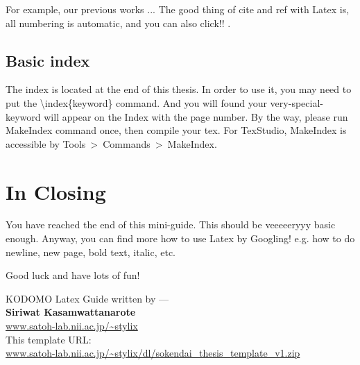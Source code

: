 For example, our previous works \cite{BibKeyLabel1,BibKeyLabel2}... The good thing of cite and ref with Latex is, all numbering is automatic, and you can also click!! \cite{BibKeyLabel3}.

\clearpage %


\subsection{Basic index}
\label{basic_index}
The index is located at the end of this thesis.
In order to use it,
you may need to put the \textbackslash index\{keyword\} command.
And you will found your very-special-keyword  will appear on the Index with the page number.
By the way, please run MakeIndex command once, then compile your tex.
\eg For TexStudio, MakeIndex is accessible by Tools~\textgreater~Commands~\textgreater~MakeIndex.

\clearpage %


\section{In Closing}
\label{closing}
You have reached the end of this mini-guide. This should be veeeeeryyy basic enough. Anyway, you can find more how to use Latex by Googling! e.g. how to do newline, new page, bold text, italic, etc.

Good luck and have lots of fun!

\begin{flushright}
KODOMO Latex Guide written by ---\\
\textbf{Siriwat Kasamwattanarote}\\ \href{http://www.satoh-lab.nii.ac.jp/~stylix}{www.satoh-lab.nii.ac.jp/\textasciitilde stylix}\\
This template URL:\\ \href{http://www.satoh-lab.nii.ac.jp/~stylix/dl/sokendai_thesis_template_v1.zip}{www.satoh-lab.nii.ac.jp/\textasciitilde stylix/dl/sokendai\_thesis\_template\_v1.zip}
\end{flushright}